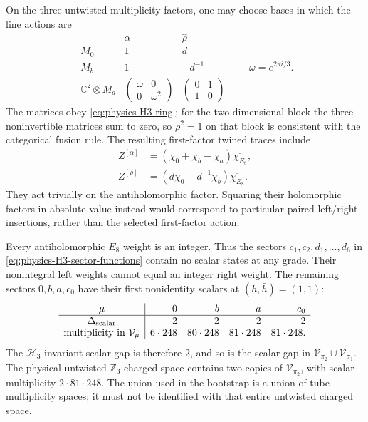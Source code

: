 On the three untwisted multiplicity factors, one may choose bases in
which the line actions are
\begin{equation}
 \begin{array}{c|cc}
   &\widehat\alpha&\widehat\rho\\\hline
   M_0&1&d\\
   M_b&1&-d^{-1}\\
   \mathbb C^2\otimes M_a&
    \begin{pmatrix}\omega&0\\0&\omega^2\end{pmatrix}&
    \begin{pmatrix}0&1\\1&0\end{pmatrix}
 \end{array}
 \qquad \omega=e^{2\pi i/3}.
 \label{eq:physics-H3-action}
\end{equation}
The matrices obey \eqref{eq:physics-H3-ring}; for the two-dimensional
block the three noninvertible matrices sum to zero, so $\rho^2=1$ on
that block is consistent with the categorical fusion rule.
The resulting first-factor twined traces include
\begin{align}
 Z^{[\alpha]}&=(\chi_0+\chi_b-\chi_a)\overline{\chi_{E_8}},\\
 Z^{[\rho]}&=(d\chi_0-d^{-1}\chi_b)\overline{\chi_{E_8}}.
 \label{eq:physics-H3-twined}
\end{align}
They act trivially on the antiholomorphic factor. Squaring their
holomorphic factors in absolute value instead would correspond to
particular paired left/right insertions, rather than the selected
first-factor action.

Every antiholomorphic $E_8$ weight is an integer. Thus the sectors
$c_1,c_2,d_1,\ldots,d_6$ in
\eqref{eq:physics-H3-sector-functions} contain no scalar states at
any grade. Their nonintegral left weights cannot equal an integer
right weight. The remaining sectors $0,b,a,c_0$ have their first
nonidentity scalars at $(h,\bar h)=(1,1)$:
\begin{equation}
 \begin{array}{c|rrrr}
 \mu&0&b&a&c_0\\\hline
 \Delta_{\rm scalar}&2&2&2&2\\
 \text{multiplicity in }\mathcal V_\mu&6\cdot248&80\cdot248&81\cdot248&81\cdot248.
 \end{array}
 \label{eq:physics-H3-scalar-table}
\end{equation}
The $\mathcal H_3$-invariant scalar gap is therefore $2$, and so is
the scalar gap in $\mathcal V_{\pi_2}\cup\mathcal V_{\sigma_1}$.
The physical untwisted $\mathbb Z_3$-charged space contains two copies
of $\mathcal V_{\pi_2}$, with scalar multiplicity $2\cdot81\cdot248$.
The union used in the bootstrap is a union of tube multiplicity spaces;
it must not be identified with that entire untwisted charged space.

